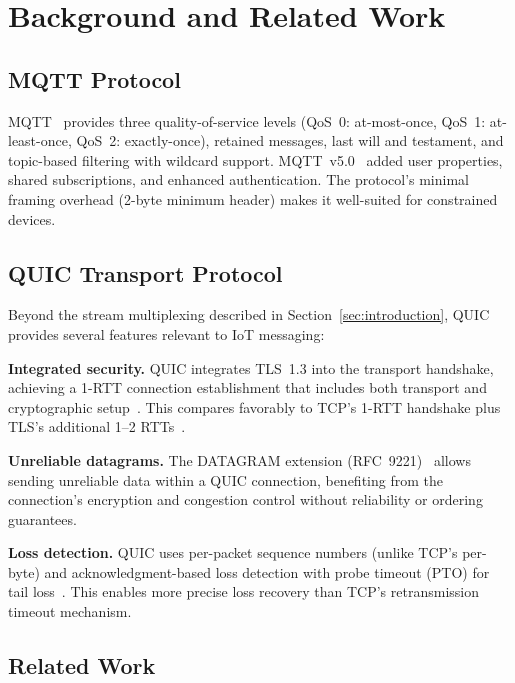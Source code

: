 \section{Background and Related Work}
\label{sec:background}

\subsection{MQTT Protocol}

MQTT~\cite{mqtt-v5-spec} provides three quality-of-service levels (QoS~0: at-most-once, QoS~1: at-least-once, QoS~2: exactly-once), retained messages, last will and testament, and topic-based filtering with wildcard support. MQTT~v5.0~\cite{mqtt-v5-spec} added user properties, shared subscriptions, and enhanced authentication. The protocol's minimal framing overhead (2-byte minimum header) makes it well-suited for constrained devices.

\subsection{QUIC Transport Protocol}

Beyond the stream multiplexing described in Section~\ref{sec:introduction}, QUIC~\cite{rfc9000} provides several features relevant to IoT messaging:

\textbf{Integrated security.} QUIC integrates TLS~1.3 into the transport handshake, achieving a 1-RTT connection establishment that includes both transport and cryptographic setup~\cite{rfc9001}. This compares favorably to TCP's 1-RTT handshake plus TLS's additional 1--2 RTTs~\cite{rfc7540}.

\textbf{Unreliable datagrams.} The DATAGRAM extension (RFC~9221)~\cite{rfc9221} allows sending unreliable data within a QUIC connection, benefiting from the connection's encryption and congestion control without reliability or ordering guarantees.

\textbf{Loss detection.} QUIC uses per-packet sequence numbers (unlike TCP's per-byte) and acknowledgment-based loss detection with probe timeout (PTO) for tail loss~\cite{rfc9002}. This enables more precise loss recovery than TCP's retransmission timeout mechanism.

\subsection{Related Work}

